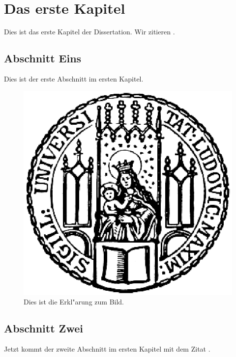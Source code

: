 \chapter{Das erste Kapitel}

Dies ist das erste Kapitel der Dissertation. Wir zitieren
\cite{Autor1:02}.


\section{Abschnitt Eins}

Dies ist der erste Abschnitt im ersten Kapitel.



\begin{figure}[htb]
  \centering
  \includegraphics[scale=0.5]{siegel}
  \caption[Kurzform f"ur das Abbildungsverzeichnis]{Dies ist die Erkl"arung zum Bild.}
\end{figure}


\section[Kurzform]{Abschnitt Zwei}

Jetzt kommt der zweite Abschnitt im ersten Kapitel
mit dem Zitat \cite{Autor2:01}.
